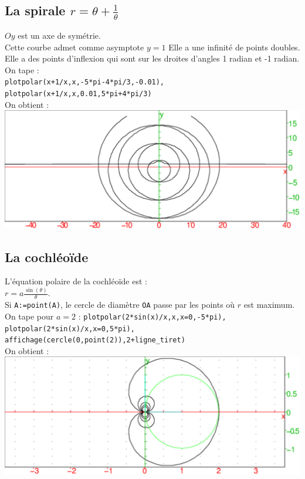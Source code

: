 \documentclass[a4paper,11pt]{book}
\begin{document}
\subsection{La spirale $\displaystyle r=\theta+\frac{1}{\theta}$}
$Oy$ est un axe de sym\'etrie.\\
Cette courbe admet comme asymptote $y=1$
Elle a une infinit\'e de points doubles.\\
Elle a des points d'inflexion qui sont sur les droites d'angles 1 radian et 
-1 radian.\\ 
On tape :\\
{\tt plotpolar(x+1/x,x,-5*pi-4*pi/3,-0.01),}\\
{\tt plotpolar(x+1/x,x,0.01,5*pi+4*pi/3)}\\
On obtient :\\
\includegraphics[width=\textwidth]{spiral7}
\subsection{La cochl\'eo\"{i}de}
L'\'equation polaire de la cochl\'eo\"{i}de est :\\
$\displaystyle r=a\frac{\sin(\theta)}{\theta}$.\\
Si {\tt A:=point(A)}, le cercle de diam\`etre {\tt OA} passe par les points o\`u $r$ est maximum.\\
On tape pour $a=2$ :
{\tt plotpolar(2*sin(x)/x,x,x=0,-5*pi),}\\
{\tt plotpolar(2*sin(x)/x,x=0,5*pi),}\\
{\tt affichage(cercle(0,point(2)),2+ligne\_tiret)}\\
On obtient :\\
\includegraphics[width=\textwidth]{spiral}
\end{document}
